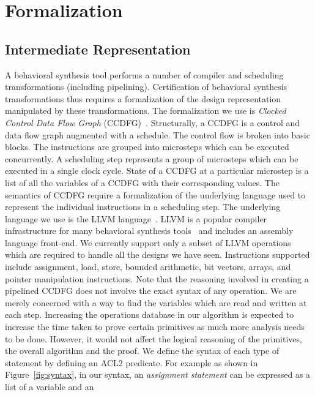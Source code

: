 \section{Formalization}
\label{sec:formalization}

\subsection{Intermediate Representation}
\label{subsec:ir}

A behavioral synthesis tool performs a number of compiler
and scheduling transformations (including pipelining). Certification of behavioral synthesis transformations thus requires a formalization of
the design representation manipulated by these
transformations. The formalization we use is {\em Clocked
  Control Data Flow Graph} (CCDFG)~\cite{rhcxy:atva-09}. 
Structurally, a CCDFG is a control and data flow graph augmented with a schedule. The control flow is broken into basic blocks. The instructions are grouped into microsteps which can be executed concurrently. A scheduling step represents a group of microsteps which can be executed in a single clock cycle. State of a CCDFG at a particular microstep is a list of all the variables of a CCDFG with their corresponding values.  The semantics of CCDFG require a formalization of the
underlying language used to represent the individual
instructions in a scheduling step.  The underlying language we use
is the LLVM language~\cite{llvm}. LLVM is a popular compiler
infrastructure for many behavioral synthesis tools~\cite{autoesl,xpilot} and includes an assembly language front-end.  We currently support
only a subset of LLVM operations which are required to handle all the designs we have
seen.  Instructions supported include assignment, load,
store, bounded arithmetic, bit vectors, arrays, and pointer
manipulation instructions.  Note that the reasoning involved 
in creating a pipelined CCDFG does not involve the exact 
syntax of any operation. We are merely concerned with a way 
to find the variables which are read and written at each step.
Increasing the operations database in our algorithm 
is expected to increase the time taken to prove certain primitives as much 
more analysis needs to be done.
However, it would not affect the logical reasoning of the primitives, the overall
algorithm and the proof.  
We define the syntax of each
type of statement by defining an ACL2 predicate.  For
example as shown in Figure~\ref{fig:syntax}, in our syntax, an {\em assignment statement} can be
expressed as a list of a variable and an
